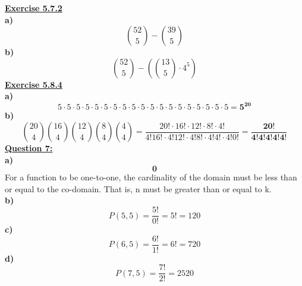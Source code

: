 \documentclass[12pt, letterpaper, twoside]{article}
\begin{document}
\break
\textbf{\underline{Exercise 5.7.2}}\\
\break
\textbf{a)}\\
\[\binom{52}{5} - \binom{39}{5}\]
\break
\textbf{b)}\\
\[\binom{52}{5} - (\binom{13}{5}\cdot4^5)\]
\break
\textbf{\underline{Exercise 5.8.4}}\\
\textbf{a)}\\
\[5\cdot5\cdot5\cdot5\cdot5\cdot5\cdot5\cdot5\cdot5\cdot5\cdot5\cdot5\cdot5\cdot5\cdot5\cdot5\cdot5\cdot5\cdot5 = \mathbf{5^{20}}\]
\break
\textbf{b)}\\
\[\binom{20}{4}\binom{16}{4}\binom{12}{4}\binom{8}{4}\binom{4}{4} = \frac{20!\cdot16!\cdot12!\cdot8!\cdot4!}{4!16!\cdot4!12!\cdot4!8!\cdot4!4!\cdot4!0!} = \mathbf{\frac{20!}{4!4!4!4!4!}}\]
\break
\newpage\noindent \textbf{\underline{Question 7:}}\\
\break
\textbf{a)}\\
\[\mathbf{0}\]
\indent For a function to be one-to-one, the cardinality of the domain must be less than or equal to the co-domain. That is, n must be greater than or equal to k.\\
\break
\textbf{b)}\\
\[P(5,5) = \frac{5!}{0!} = 5! = 120\]
\textbf{c)}\\
\[P(6,5) = \frac{6!}{1!} = 6! = 720\]
\textbf{d)}\\
\[P(7,5) = \frac{7!}{2!} = 2520\]
\end{document}
